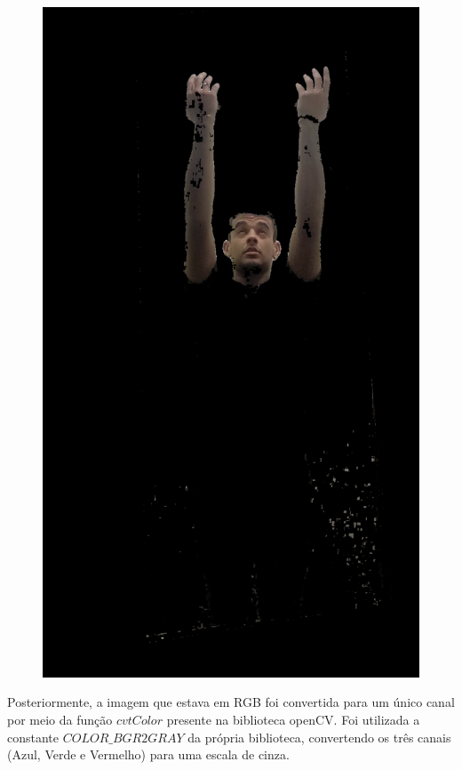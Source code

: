 \begin{figure}[H]
\begin{minipage}{\sizeImg\textwidth}
            \includegraphics[width=\textwidth]{figuras/mao_barra/skin.png}
        \end{minipage}
    \label{fig:skin}
\end{figure}

Posteriormente, a imagem que estava em \ac{RGB} foi convertida para um único canal por meio da função $cvtColor$ presente na biblioteca \ac{openCV}. Foi utilizada a constante $COLOR\_BGR2GRAY$ da própria biblioteca, convertendo os três canais (Azul, Verde e Vermelho) para uma escala de cinza.

